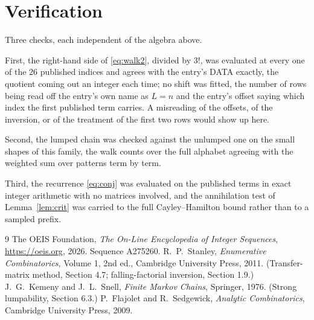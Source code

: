 \documentclass[11pt,a4paper]{article}
\theoremstyle{plain}
\theoremstyle{definition}
\begin{document}
\section{Verification}

Three checks, each independent of the algebra above.

First, the right-hand side of \eqref{eq:walk2}, divided by $3!$, was evaluated at every
one of the $26$ published indices and agrees with the entry's DATA exactly, the quotient
coming out an integer each time; no shift was fitted, the number of rows being read off the
entry's own name as $L=n$ and the entry's offset saying which index the first published
term carries. A misreading of the offsets, of the inversion, or of the treatment of the first
two rows would show up here.

Second, the lumped chain was checked against the unlumped one on the small shapes of this
family, the walk counts over the full alphabet agreeing with the weighted sum over patterns
term by term.

Third, the recurrence \eqref{eq:conj} was evaluated on the published terms in exact integer
arithmetic with no matrices involved, and the annihilation test of Lemma~\ref{lem:crit} was
carried to the full Cayley--Hamilton bound rather than to a sampled prefix.

\begin{thebibliography}{9}
 The OEIS Foundation, \emph{The On-Line Encyclopedia of Integer
Sequences}, \url{https://oeis.org}, 2026. Sequence A275260.
 R.~P.~Stanley, \emph{Enumerative Combinatorics}, Volume 1, 2nd ed.,
Cambridge University Press, 2011. (Transfer-matrix method, Section 4.7; falling-factorial
inversion, Section 1.9.)
 J.~G.~Kemeny and J.~L.~Snell, \emph{Finite Markov Chains}, Springer,
1976. (Strong lumpability, Section 6.3.)
 P.~Flajolet and R.~Sedgewick, \emph{Analytic Combinatorics}, Cambridge
University Press, 2009.
\end{thebibliography}
\end{document}
